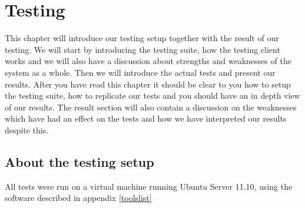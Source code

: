 \section{Testing}\label{Testing}
	This chapter will introduce our testing setup together with the result of our testing. We will start by introducing the testing suite, how the testing client works and we will also have a discussion about strengths and weaknesses of the system as a whole. Then we will introduce the actual tests and present our results. After you have read this chapter it should be clear to you how to setup the testing suite, how to replicate our tests and you should have an in depth view of our results. The result section will also contain a discussion on the weaknesses which have had an effect on the tests and how we have interpreted our results despite this.
	    
    \subsection{About the testing setup}\label{Testing:About}
        All tests were run on a virtual machine running Ubuntu Server 11.10, using the software described in appendix \ref{toolslist}
    	
 		
    	
    	
	

    


